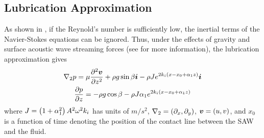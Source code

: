 
\subsection{Lubrication Approximation}
As shown in \cite{kondic2003instabilities}, if the Reynold's number is sufficiently low, the inertial terms of the Navier-Stokes equations 
can be ignored. Thus, under the effects of gravity and surface acoustic wave streaming forces (see \cite{shiokawa1994saw} for more information), the lubrication approximation gives
\begin{gather}
    \nabla_2 p = \mu \frac{\partial^2 \boldsymbol{v}}{\partial z^2} + \rho g \sin\beta \boldsymbol{i} - \rho Je^{2k_i \left( x - x_0 + \alpha_1 z \right)}\boldsymbol{i}
    \label{eq:pressure_grad}\\
    \frac{\partial p}{\partial z} = -\rho g \cos\beta - \rho J\alpha_1 e^{2k_i \left( x - x_0 + \alpha_1 z \right)}
    \label{eq:pressure_z}
\end{gather}
where $J = \left( 1 + \alpha_1^2 \right)A^2\omega^2k_i$ has units of $m/s^2$,  $\nabla_2 = \left( \partial_x, \partial_y \right)$, 
$\boldsymbol{v} = \left( u, v \right)$, and $x_0$ is a function of time denoting the position of the contact line 
between the SAW and the fluid. 

